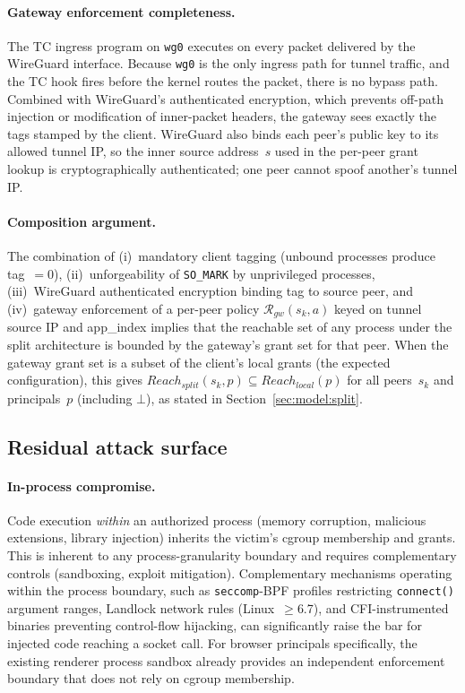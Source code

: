 \documentclass[sigconf]{acmart}
\begin{document}
\paragraph{Gateway enforcement completeness.}
The TC ingress program on \texttt{wg0} executes on every packet
delivered by the WireGuard interface.  Because \texttt{wg0} is the
only ingress path for tunnel traffic, and the TC hook fires before
the kernel routes the packet, there is no bypass path.
Combined with WireGuard's authenticated encryption, which prevents
off-path injection or modification of inner-packet headers, the
gateway sees exactly the tags stamped by the client.
WireGuard also binds each peer's public key to its allowed tunnel
IP, so the inner source address~$s$
used in the per-peer grant lookup is cryptographically
authenticated; one peer cannot spoof another's tunnel IP.

\paragraph{Composition argument.}
The combination of (i)~mandatory client tagging (unbound processes
produce tag~$= 0$), (ii)~unforgeability of \texttt{SO\_MARK} by
unprivileged processes, (iii)~WireGuard authenticated encryption
binding tag to source peer, and (iv)~gateway enforcement of a
per-peer policy $\mathcal{R}_{\mathit{gw}}(s_k, a)$ keyed on
tunnel source IP and app\_index implies that the reachable set of
any process under the split architecture is bounded by the
gateway's grant set for that peer.
When the gateway grant set is a subset of the client's local
grants (the expected configuration), this gives
$\mathit{Reach}_{\mathit{split}}(s_k, p) \subseteq
 \mathit{Reach}_{\mathit{local}}(p)$ for all peers~$s_k$ and
principals~$p$ (including $\bot$), as stated in
Section~\ref{sec:model:split}.

\subsection{Residual attack surface}
\label{sec:residual}

\paragraph{In-process compromise.}
Code execution \emph{within} an authorized process (memory
corruption, malicious extensions, library injection) inherits the
victim's cgroup membership and grants.  This is inherent to any
process-granularity boundary and requires complementary controls
(sandboxing, exploit mitigation).
Complementary mechanisms operating within the process
boundary, such as \texttt{seccomp}-BPF profiles restricting
\texttt{connect()} argument ranges, Landlock network rules
(Linux~$\geq$6.7), and CFI-instrumented binaries preventing
control-flow hijacking, can significantly raise the bar for
injected code reaching a socket call.
For browser principals specifically, the existing renderer
process sandbox already provides an independent enforcement
boundary that does not rely on cgroup membership.
\end{document}
